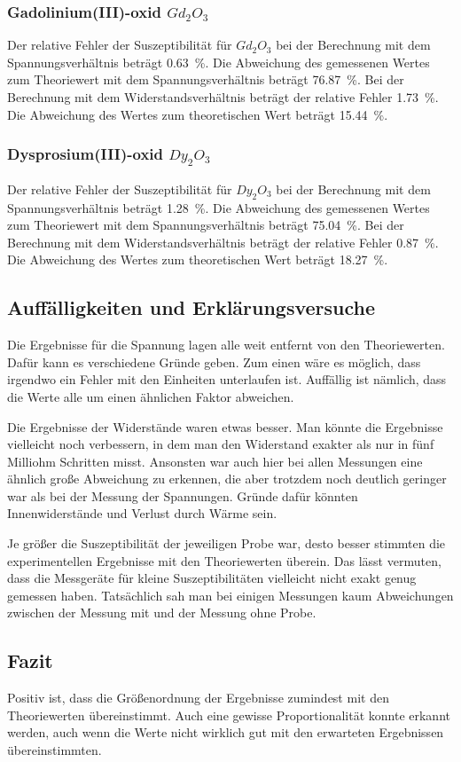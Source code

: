 \subsubsection{Gadolinium(III)-oxid $Gd_2 O_3$}
Der relative Fehler der Suszeptibilität für $Gd_2 O_3$ bei der Berechnung mit dem Spannungsverhältnis beträgt \SI{0.63}{\percent}. 
Die Abweichung des gemessenen Wertes zum Theoriewert mit dem Spannungsverhältnis beträgt \SI{76.87}{\percent}.
\newline
Bei der Berechnung mit dem Widerstandsverhältnis beträgt der relative Fehler \SI{1.73}{\percent}.
Die Abweichung des Wertes zum theoretischen Wert beträgt \SI{15.44}{\percent}.

\subsubsection{Dysprosium(III)-oxid $Dy_2 O_3$}
Der relative Fehler der Suszeptibilität für $Dy_2 O_3$ bei der Berechnung mit dem Spannungsverhältnis beträgt \SI{1.28}{\percent}. 
Die Abweichung des gemessenen Wertes zum Theoriewert mit dem Spannungsverhältnis beträgt \SI{75.04}{\percent}.
\newline
Bei der Berechnung mit dem Widerstandsverhältnis beträgt der relative Fehler \SI{0.87}{\percent}.
Die Abweichung des Wertes zum theoretischen Wert beträgt \SI{18.27}{\percent}.


\subsection{Auffälligkeiten und Erklärungsversuche}
Die Ergebnisse für die Spannung lagen alle weit entfernt von den Theoriewerten. Dafür kann es verschiedene Gründe geben. Zum einen wäre es möglich, dass irgendwo ein Fehler mit den Einheiten unterlaufen ist. 
Auffällig ist nämlich, dass die Werte alle um einen ähnlichen Faktor abweichen. 

Die Ergebnisse der Widerstände waren etwas besser. Man könnte die Ergebnisse vielleicht noch verbessern, in dem man den Widerstand exakter als nur in fünf Milliohm Schritten misst. Ansonsten war auch hier bei allen Messungen eine ähnlich große Abweichung zu erkennen, die aber trotzdem noch deutlich geringer war als bei der Messung der Spannungen. Gründe dafür könnten Innenwiderstände und Verlust durch Wärme sein. 

Je größer die Suszeptibilität der jeweiligen Probe war, desto besser stimmten die experimentellen Ergebnisse mit den Theoriewerten überein. Das lässt vermuten, dass die Messgeräte für kleine Suszeptibilitäten vielleicht nicht exakt genug gemessen haben. Tatsächlich sah man bei einigen Messungen kaum Abweichungen zwischen der Messung mit und der Messung ohne Probe. 

\subsection{Fazit}
Positiv ist, dass die Größenordnung der Ergebnisse zumindest mit den Theoriewerten übereinstimmt. Auch eine gewisse  Proportionalität konnte erkannt werden, auch wenn die Werte nicht wirklich gut mit den erwarteten Ergebnissen übereinstimmten. 
